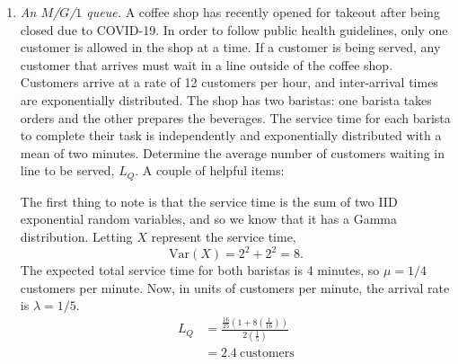 \begin{enumerate}
\item \emph{An $M$/$G$/$1$ queue.}  A coffee shop has recently opened
  for takeout after being closed due to COVID-19. In order to follow
  public health guidelines, only one customer is allowed in the shop
  at a time. If a customer is being served, any customer
  that arrives must wait in a line outside of the coffee
  shop. Customers arrive at a rate of 12 customers per hour, and
  inter-arrival times are exponentially distributed. The shop has two
  baristas: one barista takes orders and the other prepares the
  beverages. The service time for each barista to complete their task
  is independently and exponentially distributed with a mean of two
  minutes. Determine the average number of customers waiting in line
  to be served, $L_Q$. A couple of helpful items:

\begin{solution}
\bs The first thing to note is that the service time is the sum of two IID exponential
random variables, and so we know that it has a Gamma distribution.
Letting $X$ represent the service time,
\[ \text{Var}(X) = 2^2 + 2^2 = 8.\]
The expected total service time for both baristas is 4 minutes, so
$\mu = 1/4$ customers per minute. 
Now, in units of customers per minute, the arrival rate is $\lambda = 1/5$.
\begin{align*}
      L_Q &= \frac{\frac{16}{25}\left(1 + 8\left(\frac{1}{16}\right)\right)}{2\left(\frac{1}{5}\right)} \\
      &= 2.4 ~\text{customers}
\end{align*}
\end{solution}



\end{enumerate}
